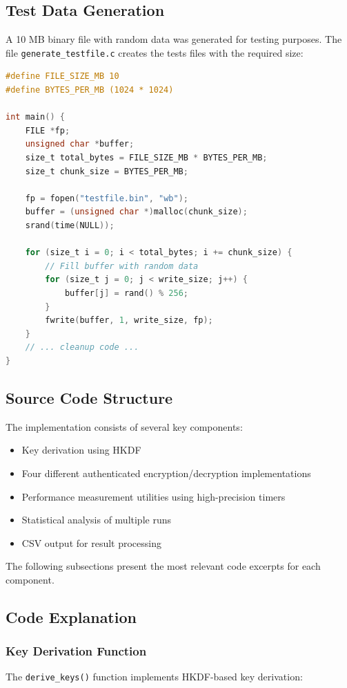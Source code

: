 \documentclass[12pt,a4paper]{article}
\begin{document}
\subsection{Test Data Generation}
A 10 MB binary file with random data was generated for testing purposes. The file \texttt{generate\_testfile.c} creates the tests files with the required size:

\begin{lstlisting}[language=C, caption=Test file generation code, label=lst:testgen]
#define FILE_SIZE_MB 10
#define BYTES_PER_MB (1024 * 1024)

int main() { 
    FILE *fp;
    unsigned char *buffer;
    size_t total_bytes = FILE_SIZE_MB * BYTES_PER_MB;
    size_t chunk_size = BYTES_PER_MB;
    
    fp = fopen("testfile.bin", "wb");
    buffer = (unsigned char *)malloc(chunk_size);
    srand(time(NULL));
    
    for (size_t i = 0; i < total_bytes; i += chunk_size) {
        // Fill buffer with random data
        for (size_t j = 0; j < write_size; j++) {
            buffer[j] = rand() % 256;
        }
        fwrite(buffer, 1, write_size, fp);
    }
    // ... cleanup code ...
}
\end{lstlisting}

\subsection{Source Code Structure}
The implementation consists of several key components:
\begin{itemize}
    \item Key derivation using HKDF
    \item Four different authenticated encryption/decryption implementations
    \item Performance measurement utilities using high-precision timers
    \item Statistical analysis of multiple runs
    \item CSV output for result processing
\end{itemize}

The following subsections present the most relevant code excerpts for each component.

\subsection{Code Explanation}

\subsubsection{Key Derivation Function}
The \texttt{derive\_keys()} function implements HKDF-based key derivation:
\end{document}
